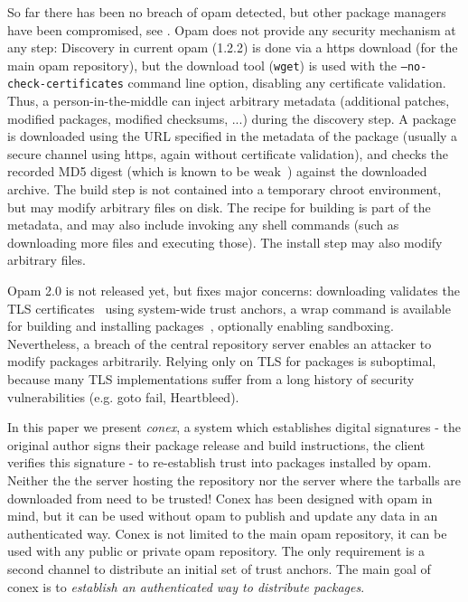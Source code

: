 \documentclass[nocopyrightspace]{sigplanconf}
\begin{document}
So far there has been no breach of opam detected, but other package managers have been compromised, see \cite{cabal,maven,npm,rubygems}.
Opam does not provide any security mechanism at any step:
Discovery in current opam (1.2.2) is done via a https download (for the main opam repository), but the download tool (\texttt{wget}) is used with the \texttt{--no-check-certificates} command line option, disabling any certificate validation.
Thus, a person-in-the-middle can inject arbitrary metadata (additional patches, modified packages, modified checksums, ...) during the discovery step.
A package is downloaded using the URL specified in the metadata of the package (usually a secure channel using https, again without certificate validation), and checks the recorded MD5 digest (which is known to be weak~\cite{rfc6151}) against the downloaded archive.
The build step is not contained into a temporary chroot environment, but may modify arbitrary files on disk.
The recipe for building is part of the metadata, and may also include invoking any shell commands (such as downloading more files and executing those).
The install step may also modify arbitrary files.

Opam 2.0 is not released yet, but fixes major concerns:
downloading validates the TLS certificates~\cite{opampr} using system-wide trust anchors,
a wrap command is available for building and installing packages~\cite{wrappr}, optionally enabling sandboxing.
Nevertheless, a breach of the central repository server enables an attacker to modify packages arbitrarily.
Relying only on TLS for packages is suboptimal, because many TLS implementations suffer from a long history of security vulnerabilities (e.g. goto fail, Heartbleed).

In this paper we present \emph{conex}, a system which establishes digital signatures - the original author signs their package release and build instructions, the client verifies this signature - to re-establish trust into packages installed by opam.
Neither the the server hosting the repository nor the server where the tarballs are downloaded from need to be trusted!
Conex has been designed with opam in mind, but it can be used without opam to publish and update any data in an authenticated way.
Conex is not limited to the main opam repository, it can be used with any public or private opam repository.
The only requirement is a second channel to distribute an initial set of trust anchors.
The main goal of conex is to \emph{establish an authenticated way to distribute packages}.
\end{document}
